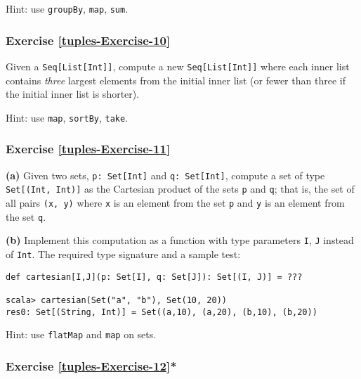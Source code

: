 Hint: use \lstinline!groupBy!, \lstinline!map!, \lstinline!sum!.

\subsubsection{Exercise \label{tuples-Exercise-10}\ref{tuples-Exercise-10}}

Given a \lstinline!Seq[List[Int]]!, compute a new \lstinline!Seq[List[Int]]!
where each inner list contains \emph{three} largest elements from
the initial inner list (or fewer than three if the initial inner list
is shorter).

Hint: use \lstinline!map!, \lstinline!sortBy!, \lstinline!take!.

\subsubsection{Exercise \label{tuples-Exercise-11}\ref{tuples-Exercise-11}}

\textbf{(a)} Given two sets, \lstinline!p: Set[Int]! and \lstinline!q: Set[Int]!,
compute a set of type \lstinline!Set[(Int, Int)]! as the Cartesian
product of the sets \lstinline!p! and \lstinline!q!; that is, the
set of all pairs \lstinline!(x, y)! where \lstinline!x! is an element
from the set \lstinline!p! and \lstinline!y! is an element from
the set \lstinline!q!. 

\textbf{(b)} Implement this computation as a function with type parameters
\lstinline!I!, \lstinline!J! instead of \lstinline!Int!. The required
type signature and a sample test:
\begin{lstlisting}
def cartesian[I,J](p: Set[I], q: Set[J]): Set[(I, J)] = ???

scala> cartesian(Set("a", "b"), Set(10, 20))
res0: Set[(String, Int)] = Set((a,10), (a,20), (b,10), (b,20))
\end{lstlisting}

Hint: use \lstinline!flatMap! and \lstinline!map! on sets.

\subsubsection{Exercise \label{tuples-Exercise-12}\ref{tuples-Exercise-12}{*}}

